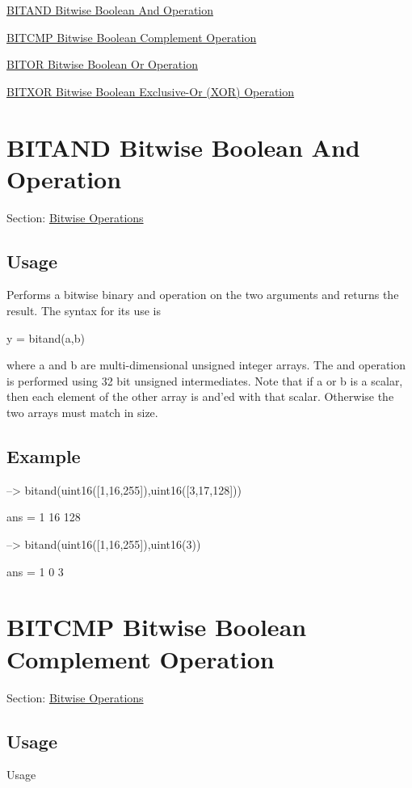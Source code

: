 
\begin{DoxyItemize}
\item \hyperlink{binary_bitand}{B\-I\-T\-A\-N\-D Bitwise Boolean And Operation}  
\item \hyperlink{binary_bitcmp}{B\-I\-T\-C\-M\-P Bitwise Boolean Complement Operation}  
\item \hyperlink{binary_bitor}{B\-I\-T\-O\-R Bitwise Boolean Or Operation}  
\item \hyperlink{binary_bitxor}{B\-I\-T\-X\-O\-R Bitwise Boolean Exclusive-\/\-Or (X\-O\-R) Operation}  
\end{DoxyItemize}\hypertarget{binary_bitand}{}\section{B\-I\-T\-A\-N\-D Bitwise Boolean And Operation}\label{binary_bitand}
Section\-: \hyperlink{sec_binary}{Bitwise Operations} \hypertarget{vtkwidgets_vtkxyplotwidget_Usage}{}\subsection{Usage}\label{vtkwidgets_vtkxyplotwidget_Usage}
Performs a bitwise binary and operation on the two arguments and returns the result. The syntax for its use is \begin{DoxyVerb}   y = bitand(a,b)
\end{DoxyVerb}
 where {\ttfamily a} and {\ttfamily b} are multi-\/dimensional unsigned integer arrays. The and operation is performed using 32 bit unsigned intermediates. Note that if a or b is a scalar, then each element of the other array is and'ed with that scalar. Otherwise the two arrays must match in size. \hypertarget{variables_struct_Example}{}\subsection{Example}\label{variables_struct_Example}

\begin{DoxyVerbInclude}
--> bitand(uint16([1,16,255]),uint16([3,17,128]))

ans = 
   1  16 128 

--> bitand(uint16([1,16,255]),uint16(3))

ans = 
 1 0 3 
\end{DoxyVerbInclude}
 \hypertarget{binary_bitcmp}{}\section{B\-I\-T\-C\-M\-P Bitwise Boolean Complement Operation}\label{binary_bitcmp}
Section\-: \hyperlink{sec_binary}{Bitwise Operations} \hypertarget{vtkwidgets_vtkxyplotwidget_Usage}{}\subsection{Usage}\label{vtkwidgets_vtkxyplotwidget_Usage}
Usage

